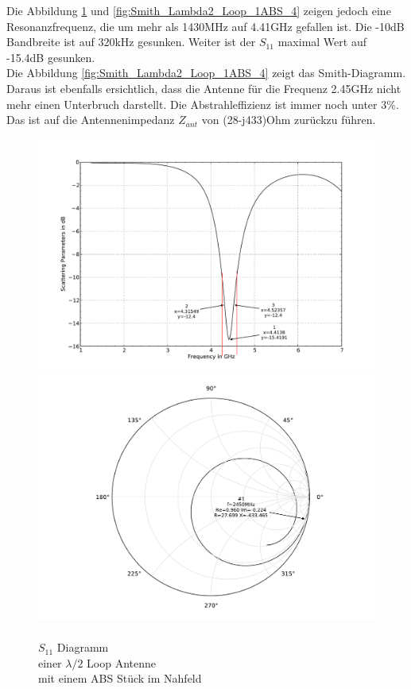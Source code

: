 Die Abbildung \ref{fig:S11_Lambda2_Loop_1ABS_3} und \ref{fig:Smith_Lambda2_Loop_1ABS_4} zeigen jedoch eine Resonanzfrequenz, die um mehr als 1430MHz auf 4.41GHz gefallen ist. Die -10dB Bandbreite ist auf 320kHz gesunken. Weiter ist der $S_{11}$ maximal Wert auf -15.4dB gesunken.\\
Die Abbildung \ref{fig:Smith_Lambda2_Loop_1ABS_4} zeigt das Smith-Diagramm. Daraus ist ebenfalls ersichtlich, dass die Antenne für die Frequenz 2.45GHz nicht mehr einen Unterbruch darstellt. Die Abstrahleffizienz ist immer noch unter $3\%$. Das ist auf die Antennenimpedanz $Z_{ant}$ von (28-j433)Ohm zurückzu führen.

\begin{figure}[!h]
\begin{center}
  \includegraphics[width=\linewidth]{content/bilder/Evaluation/Loop/L2/1ABS/S11_Loop_Lambda2_mitABS.pdf}
  \caption{\\$S_{11}$ Diagramm \\einer $\lambda/2$ Loop Antenne \\mit einem ABS Stück im Nahfeld}\label{fig:S11_Lambda2_Loop_1ABS_3}
\endminipage%
{}
  \includegraphics[width=\linewidth]{content/bilder/Evaluation/Loop/L2/1ABS/Smith_Loop_Lambda2_mitABS.pdf}

\end{center}
\end{figure}
